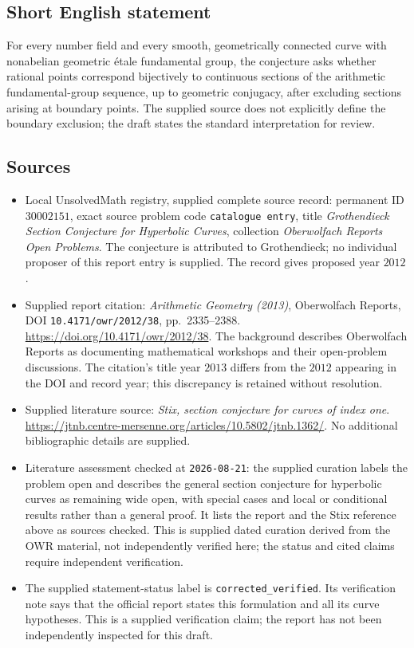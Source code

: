 \documentclass[11pt]{article}
\begin{document}
\subsection{Short English statement}
For every number field and every smooth, geometrically connected curve with nonabelian geometric étale fundamental group, the conjecture asks whether rational points correspond bijectively to continuous sections of the arithmetic fundamental-group sequence, up to geometric conjugacy, after excluding sections arising at boundary points. The supplied source does not explicitly define the boundary exclusion; the draft states the standard interpretation for review.
\subsection{Sources}
\begin{itemize}
\item Local UnsolvedMath registry, supplied complete source record: permanent ID \(30002151\), exact source problem code \texttt{catalogue entry}, title \emph{Grothendieck Section Conjecture for Hyperbolic Curves}, collection \emph{Oberwolfach Reports Open Problems}. The conjecture is attributed to Grothendieck; no individual proposer of this report entry is supplied. The record gives proposed year \(2012\).
\item Supplied report citation: \emph{Arithmetic Geometry (2013)}, Oberwolfach Reports, DOI \texttt{10.4171/owr/2012/38}, pp.~2335--2388. \url{https://doi.org/10.4171/owr/2012/38}. The background describes Oberwolfach Reports as documenting mathematical workshops and their open-problem discussions. The citation's title year \(2013\) differs from the \(2012\) appearing in the DOI and record year; this discrepancy is retained without resolution.
\item Supplied literature source: \emph{Stix, section conjecture for curves of index one}. \url{https://jtnb.centre-mersenne.org/articles/10.5802/jtnb.1362/}. No additional bibliographic details are supplied.
\item Literature assessment checked at \texttt{2026-08-21}: the supplied curation labels the problem open and describes the general section conjecture for hyperbolic curves as remaining wide open, with special cases and local or conditional results rather than a general proof. It lists the report and the Stix reference above as sources checked. This is supplied dated curation derived from the OWR material, not independently verified here; the status and cited claims require independent verification.
\item The supplied statement-status label is \texttt{corrected\_verified}. Its verification note says that the official report states this formulation and all its curve hypotheses. This is a supplied verification claim; the report has not been independently inspected for this draft.
\end{itemize}
\end{document}
